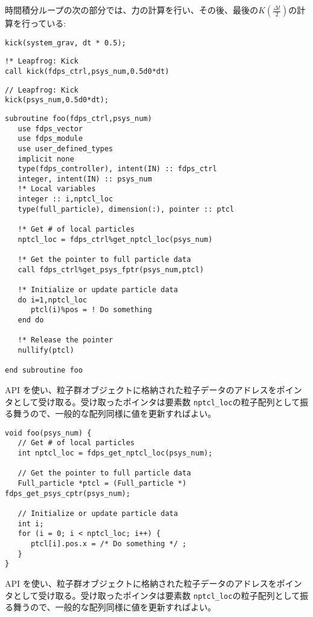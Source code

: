 時間積分ループの次の部分では、力の計算を行い、その後、最後の$K(\frac{\Delta t}{2})$の計算を行っている:
\ifCpp%
\begin{lstlisting}[caption=$K(\frac{\Delta t}{2})$オペレータの計算]
kick(system_grav, dt * 0.5);
\end{lstlisting}
\endifCpp
\ifFtn%
\begin{lstlisting}[caption=$K(\frac{\Delta t}{2})$オペレータの計算]
!* Leapfrog: Kick
call kick(fdps_ctrl,psys_num,0.5d0*dt)
\end{lstlisting}
\endifFtn
\ifC%
\begin{lstlisting}[caption=$K(\frac{\Delta t}{2})$オペレータの計算]
// Leapfrog: Kick
kick(psys_num,0.5d0*dt);
\end{lstlisting}
\endifC

\ifFtn%
\begin{lstlisting}[caption=粒子データの更新]
subroutine foo(fdps_ctrl,psys_num)
   use fdps_vector
   use fdps_module
   use user_defined_types
   implicit none
   type(fdps_controller), intent(IN) :: fdps_ctrl
   integer, intent(IN) :: psys_num
   !* Local variables
   integer :: i,nptcl_loc
   type(full_particle), dimension(:), pointer :: ptcl

   !* Get # of local particles
   nptcl_loc = fdps_ctrl%get_nptcl_loc(psys_num)

   !* Get the pointer to full particle data
   call fdps_ctrl%get_psys_fptr(psys_num,ptcl)
   
   !* Initialize or update particle data
   do i=1,nptcl_loc
      ptcl(i)%pos = ! Do something
   end do
   
   !* Release the pointer
   nullify(ptcl)

end subroutine foo
\end{lstlisting}
API \getPsysPtr を使い、粒子群オブジェクトに格納された粒子データのアドレスをポインタとして受け取る。受け取ったポインタは要素数 \texttt{nptcl\_loc}の粒子配列として振る舞うので、一般的な配列同様に値を更新すればよい。
\endifFtn
\ifC%
\begin{lstlisting}[caption=粒子データの更新]
void foo(psys_num) {
   // Get # of local particles
   int nptcl_loc = fdps_get_nptcl_loc(psys_num);
   
   // Get the pointer to full particle data
   Full_particle *ptcl = (Full_particle *) fdps_get_psys_cptr(psys_num);
   
   // Initialize or update particle data
   int i;
   for (i = 0; i < nptcl_loc; i++) {
      ptcl[i].pos.x = /* Do something */ ;
   }  
}
\end{lstlisting}
API \getPsysPtr を使い、粒子群オブジェクトに格納された粒子データのアドレスをポインタとして受け取る。受け取ったポインタは要素数 \texttt{nptcl\_loc}の粒子配列として振る舞うので、一般的な配列同様に値を更新すればよい。
\endifC

